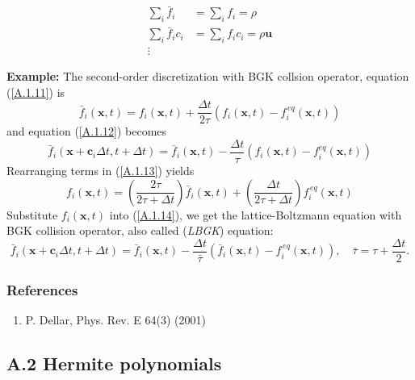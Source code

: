 \documentclass[draft]{article}
\begin{document}
\begin{align*}
	\sum_i \bar{f}_i &= \sum_i f_i = \rho \\
	\sum_i \bar{f}_i c_i &= \sum_i f_i c_i = \rho \bm{u} \\
	\vdots
\end{align*}

{\large \textbf{Example:}} The second-order discretization with BGK collsion operator, equation (\ref{A.1.11}) is
\begin{equation}
	\bar{f}_i(\bm{x}, t) = f_i(\bm{x}, t) + \frac{\Delta t}{2 \tau} (f_i(\bm{x}, t) - f_i^{\, eq}(\bm{x}, t)) \label{A.1.13}
\end{equation}
and equation (\ref{A.1.12}) becomes
\begin{equation}
	\bar{f}_i(\bm{x} + \bm{c}_i \Delta t, t + \Delta t) = \bar{f}_i(\bm{x}, t) - \frac{\Delta t}{\tau} (f_i(\bm{x}, t) - f_i^{eq}(\bm{x}, t)) \label{A.1.14}
\end{equation}
Rearranging terms in (\ref{A.1.13}) yields
\begin{equation*}
	f_i(\bm{x}, t) = \left ( \frac{2\tau}{2\tau + \Delta t} \right ) \bar{f}_i(\bm{x}, t) + \left ( \frac{\Delta t}{2\tau + \Delta t} \right ) f_i^{\, eq} (\bm{x}, t)
\end{equation*}
Substitute $f_i(\bm{x}, t)$ into (\ref{A.1.14}), we get the lattice-Boltzmann equation with BGK collision operator, also called (\textit{LBGK}) equation: 
\begin{equation}
	\bar{f}_i(\bm{x} + \bm{c}_i \Delta t, t + \Delta t) = \bar{f}_i(\bm{x}, t) - \frac{\Delta t}{\bar{\tau}}(\bar{f}_i(\bm{x}, t) - f_i^{\, eq}(\bm{x}, t)), \quad \bar{\tau} = \tau + \frac{\Delta t}{2}.
\end{equation}

\clearpage

\subsubsection*{References}
\begin{enumerate}
	\item \label{ref:dellar} P. Dellar, Phys. Rev. E 64(3) (2001)
\end{enumerate}
\clearpage










\subsection*{\huge A.2 Hermite polynomials}
\vspace*{0.5cm}
\end{document}
